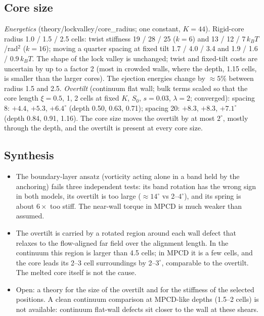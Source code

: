 \documentclass[11pt,a4paper]{article}
\newcommand{\kT}{k_BT}\newcommand{\half}{\tfrac12}\newcommand{\la}{\ell_a}
\begin{document}
\subsection{Core size}
\emph{Energetics} (theory/lockvalley/core\_radius; one constant, $K=44$). Rigid-core radius 1.0 / 1.5 / 2.5 cells: twist stiffness 19 / 28 / 25 ($k=6$) and
13 / 12 / 7\,$\kT$/rad$^2$ ($k=16$); moving a quarter spacing at fixed tilt 1.7 / 4.0 / 3.4 and 1.9 / 1.6 / 0.9\,$\kT$. The shape of the lock valley is unchanged;
twist and fixed-tilt costs are uncertain by up to a factor 2 (most in crowded walls, where the depth, 1.15 cells, is smaller than the larger cores). The
ejection energies change by $\approx5\%$ between radius 1.5 and 2.5.
\emph{Overtilt} (continuum flat wall; bulk terms scaled so that the core length $\xi=0.5$, 1, 2 cells at fixed $K$, $S_0$, $s=0.03$, $\lambda=2$; converged):
spacing 8: $+4.4$, $+5.3$, $+6.4^\circ$ (depth 0.50, 0.63, 0.71); spacing 20: $+8.3$, $+8.3$, $+7.1^\circ$ (depth 0.84, 0.91, 1.16). The core size moves the overtilt by at
most $2^\circ$, mostly through the depth, and the overtilt is present at every core size.

\subsection{Synthesis}
\begin{itemize}
\item The boundary-layer ansatz (vorticity acting alone in a band held by the anchoring) fails three independent tests: its band rotation has the wrong
sign in both models, its overtilt is too large ($\approx14^\circ$ vs 2--$4^\circ$), and its spring is about $6\times$ too stiff. The near-wall torque in MPCD is much
weaker than assumed.
\item The overtilt is carried by a rotated region around each wall defect that relaxes to the flow-aligned far field over the alignment length. In the
continuum this region is larger than 4.5 cells; in MPCD it is a few cells, and the core leads its 2--3 cell surroundings by 2--$3^\circ$, comparable to the
overtilt. The melted core itself is not the cause.
\item Open: a theory for the size of the overtilt and for the stiffness of the selected positions. A clean continuum comparison at MPCD-like depths
(1.5--2 cells) is not available: continuum flat-wall defects sit closer to the wall at these shears.
\end{itemize}
\end{document}
